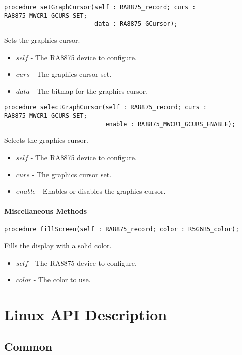 \documentclass[10pt, openany]{book}
\begin{document}
\begin{lstlisting}
procedure setGraphCursor(self : RA8875_record; curs : RA8875_MWCR1_GCURS_SET;
                         data : RA8875_GCursor);
\end{lstlisting}
Sets the graphics cursor.
\begin{itemize}
  \item $self$ - The RA8875 device to configure.
  \item $curs$ - The graphics cursor set.
  \item $data$ - The bitmap for the graphics cursor.
\end{itemize}

\begin{lstlisting}
procedure selectGraphCursor(self : RA8875_record; curs : RA8875_MWCR1_GCURS_SET;
                            enable : RA8875_MWCR1_GCURS_ENABLE);
\end{lstlisting}
Selects the graphics cursor.
\begin{itemize}
  \item $self$ - The RA8875 device to configure.
  \item $curs$ - The graphics cursor set.
  \item $enable$ - Enables or disables the graphics cursor.
\end{itemize}

\subsubsection{Miscellaneous Methods}
\begin{lstlisting}
procedure fillScreen(self : RA8875_record; color : R5G6B5_color);
\end{lstlisting}
Fills the display with a solid color.
\begin{itemize}
  \item $self$ - The RA8875 device to configure.
  \item $color$ - The color to use.
\end{itemize}

\chapter{Linux API Description}

\section{Common}
\end{document}
